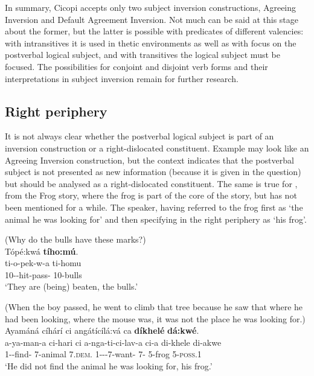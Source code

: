 \documentclass[output=paper]{langscibook}
\begin{document}
\z
\z

In summary, Cicopi accepts only two subject inversion constructions, Agreeing Inversion and Default Agreement Inversion. Not much can be said at this stage about the former, but the latter is possible with predicates of different valencies: with intransitives it is used in thetic environments as well as with focus on the postverbal logical subject, and with transitives the logical subject must be focused. The possibilities for conjoint and disjoint verb forms and their interpretations in subject inversion remain for further research. 

\subsection{Right periphery}
\label{bkm:Ref121988320}
It is not always clear whether the postverbal logical subject is part of an inversion construction or a right-dislocated constituent. Example  may look like an Agreeing Inversion construction, but the context indicates that the postverbal subject is not presented as new information (because it is given in the question) but should be analysed as a right-dislocated constituent. The same is true for , from the Frog story, where the frog is part of the core of the story, but has not been mentioned for a while. The speaker, having referred to the frog first as ‘the animal he was looking for’ and then specifying in the right periphery as ‘his frog’.

\ea
\label{bkm:Ref120095706}
(Why do the bulls have these marks?)\\
Tópé:kwá \textbf{tího:mú}.\\
\gll
ti-o-pek-w-a  ti-homu\\
10\SM{}-\PROG{}-hit-pass-\FV{}  10-bulls\\
\glt
‘They are (being) beaten, the bulls.’\\

\z

\ea
\label{bkm:Ref124151476}
(When the boy passed, he went to climb that tree because he saw that where he had been looking, where the mouse was, it was not the place he was looking for.)\\
Ayamáná cíhárí ci angátícílá:vá ca \textbf{díkhelé} \textbf{dá:kwé}. \\
\gll
a-ya-man-a  ci-hari  ci  a-nga-ti-ci-lav-a  ci-a   di-khele  di-akwe \\
1\SM{}-\NEG{}-find-\FV{}  7-animal  7\textsc{.dem}.\PROX{}  1\SM-\REL{}-\IPFV{}-7\OM{}-want-\FV{}  7-\CONN{}  5-frog  5-\textsc{poss.1}\\
\glt
‘He did not find the animal he was looking for, his frog.’
\end{document}
